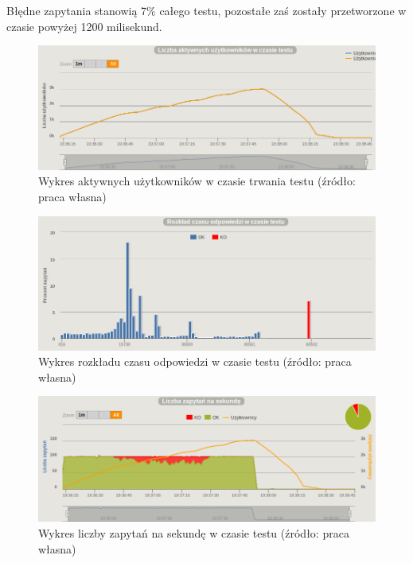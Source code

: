 \documentclass[12pt,twoside]{article}
\begin{document}
Błędne zapytania stanowią 7\% całego testu, pozostałe zaś zostały
przetworzone w czasie powyżej 1200 milisekund.

\begin{figure}[htbp]
\centering
\includegraphics[resolution=150]{test_results/elixir/matrix/screenshots/active_users.png}
\caption{Wykres aktywnych użytkowników w czasie trwania testu (źródło: praca własna)}
\end{figure}

\begin{figure}[htbp]
\centering
\includegraphics[resolution=150]{test_results/elixir/matrix/screenshots/distribution.png}
\caption{Wykres rozkładu czasu odpowiedzi w czasie testu (źródło: praca własna)}
\end{figure}

\begin{figure}[htbp]
\centering
\includegraphics[resolution=150]{test_results/elixir/matrix/screenshots/requests.png}
\caption{Wykres liczby zapytań na sekundę w czasie testu (źródło: praca własna)}
\end{figure}
\end{document}
